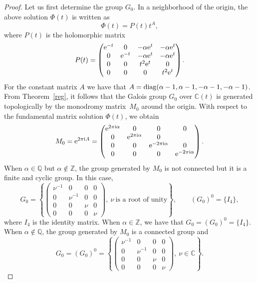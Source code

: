 \documentclass[pdftex]{sigma}
\numberwithin{equation}{section}
\begin{document}
\begin{proof}
 Let us first determine the group $G_0$.
 In a neighborhood of the origin, the above solution $\Phi(t)$ is written as
 \[
 \Phi(t)=P(t) t^A ,
 \]
 where $P(t)$ is the holomorphic matrix
 \[
 P(t)=\begin{pmatrix}
 {\rm e}^{-t} & 0 & -\alpha {\rm e}^t & -\alpha {\rm e}^t\\
 0 & {\rm e}^{-t} & - \alpha {\rm e}^t & -\alpha {\rm e}^t \\
 0 & 0 & t^2 {\rm e}^t & 0\\
 0 & 0 & 0 & t^2 {\rm e}^t
 \end{pmatrix} .
 \]
 For the constant matrix $A$ we have that $A={\rm diag} (\alpha-1, \alpha-1, -\alpha-1, -\alpha-1)$.
 From Theorem~\ref{reg}, it follows that the Galois group $G_0$ over $\mathbb{C}(t)$ is generated topologically by the monodromy matrix~$M_0$ around the origin.
 With respect to the fundamental matrix solution $\Phi(t)$, we obtain
 \[
 M_0={\rm e}^{2 \pi {\rm i} A}=\begin{pmatrix}
 {\rm e}^{2 \pi {\rm i} \alpha} & 0 & 0 & 0\\
 0 & {\rm e}^{2 \pi {\rm i} \alpha} & 0\\
 0 & 0 & {\rm e}^{-2 \pi {\rm i} \alpha} & 0\\
 0 & 0 & 0 & {\rm e}^{-2 \pi {\rm i} \alpha}
 \end{pmatrix} .
 \]
 When $\alpha\in\mathbb{Q}$ but $\alpha\notin\mathbb{Z}$, the group generated by $M_0$ is not connected but it is a finite and cyclic group. In this case,
 \[
 G_0=\left\{\begin{pmatrix}
 \nu^{-1} & 0 & 0 & 0\\
 0 & \nu^{-1} & 0 & 0\\
 0 & 0 & \nu & 0\\
 0 & 0 & 0 & \nu
 \end{pmatrix}, \ \nu \ \text{is a root of unity} \right\}, \qquad (G_0)^0=\{I_4\} ,
 \]
 where $I_4$ is the identity matrix. When $\alpha\in\mathbb{Z}$, we have that $G_0=(G_0)^0=\{I_4\}$. When $\alpha\notin\mathbb{Q}$, the group generated by $M_0$ is a connected group
 and
 \[
 G_0=(G_0)^0=\left\{ \begin{pmatrix}
 \nu^{-1} & 0 & 0 & 0\\
 0 & \nu^{-1} & 0 & 0\\
 0 & 0 & \nu & 0\\
 0 & 0 & 0 & \nu
 \end{pmatrix},\ \nu\in\mathbb{C} \right\} .
 \]


\end{proof}
\end{document}
